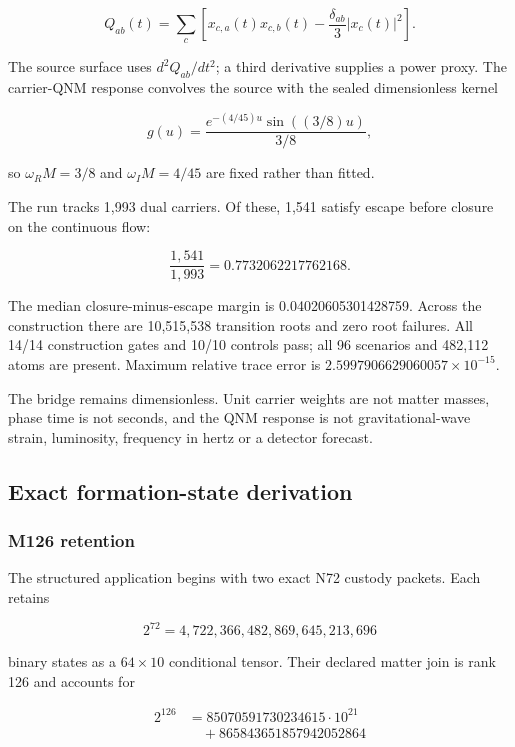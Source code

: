\[
Q_{ab}(t)=\sum_c\left[x_{c,a}(t)x_{c,b}(t)
-\frac{\delta_{ab}}{3}|x_c(t)|^2\right].
\]

The source surface uses \(d^2Q_{ab}/dt^2\); a third derivative supplies
a power proxy. The carrier-QNM response convolves the source with the
sealed dimensionless kernel

\[
g(u)=\frac{e^{-(4/45)u}\sin((3/8)u)}{3/8},
\]

so \(\omega_RM=3/8\) and \(\omega_IM=4/45\) are fixed rather than
fitted.

The run tracks 1,993 dual carriers. Of these, 1,541 satisfy escape
before closure on the continuous flow:

\[
\frac{1{,}541}{1{,}993}=0.7732062217762168.
\]

The median closure-minus-escape margin is 0.04020605301428759. Across
the construction there are 10,515,538 transition roots and zero root
failures. All 14/14 construction gates and 10/10 controls pass; all 96
scenarios and 482,112 atoms are present. Maximum relative trace error is
\(2.5997906629060057\times10^{-15}\).

The bridge remains dimensionless. Unit carrier weights are not matter
masses, phase time is not seconds, and the QNM response is not
gravitational-wave strain, luminosity, frequency in hertz or a detector
forecast.

\subsection{Exact formation-state
derivation}\label{viii-ch08-exact-formation-state-derivation}

\subsubsection{M126 retention}\label{viii-ch08-m126-retention}

The structured application begins with two exact N72 custody packets.
Each retains

\[
2^{72}=4{,}722{,}366{,}482{,}869{,}645{,}213{,}696
\]

binary states as a \(64\times10\) conditional tensor. Their declared
matter join is rank 126 and accounts for

\[
\begin{aligned}2^{126}&=85070591730234615\cdot10^{21}\\&\quad+865843651857942052864\end{aligned}
\]

